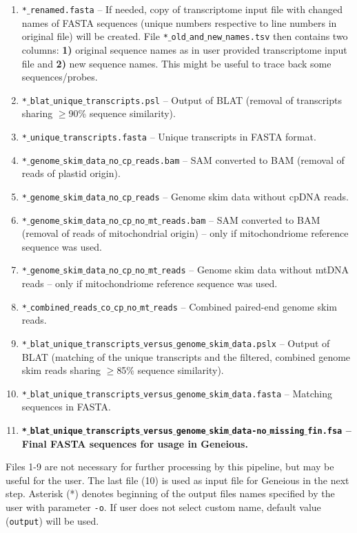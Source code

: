 \documentclass[a4paper, 11pt, twoside]{article}
\begin{document}
\begin{enumerate}[start=0]
  \item \texttt{*$\_$renamed.fasta} -- If needed, copy of transcriptome input file with changed names of FASTA sequences (unique numbers respective to line numbers in original file) will be created. File \texttt{*$\_$old$\_$and$\_$new$\_$names.tsv} then contains two columns: \textbf{1)} original sequence names as in user provided transcriptome input file and \textbf{2)} new sequence names. This might be useful to trace back some sequences/probes.
  \item \texttt{*$\_$blat$\_$unique$\_$transcripts.psl} -- Output of BLAT (removal of transcripts sharing $\geq$90\% sequence similarity).
  \item \texttt{*$\_$unique$\_$transcripts.fasta} -- Unique transcripts in FASTA format.
  \item \texttt{*$\_$genome$\_$skim$\_$data$\_$no$\_$cp$\_$reads.bam} -- SAM converted to BAM (removal of reads of plastid origin).
  \item \texttt{*$\_$genome$\_$skim$\_$data$\_$no$\_$cp$\_$reads} -- Genome skim data without cpDNA reads.
  \item \texttt{*$\_$genome$\_$skim$\_$data$\_$no$\_$cp$\_$no$\_$mt$\_$reads.bam} -- SAM converted to BAM (removal of reads of mitochondrial origin)  -- only if mitochondriome reference sequence was used.
  \item \texttt{*$\_$genome$\_$skim$\_$data$\_$no$\_$cp$\_$no$\_$mt$\_$reads} -- Genome skim data without mtDNA reads -- only if mitochondriome reference sequence was used.
  \item \texttt{*$\_$combined$\_$reads$\_$co$\_$cp$\_$no$\_$mt$\_$reads} -- Combined paired-end genome skim reads.
  \item \texttt{*$\_$blat$\_$unique$\_$transcripts$\_$versus$\_$genome$\_$skim$\_$data.pslx} -- Output of BLAT (ma\-tching of the unique transcripts and the filtered, combined genome skim reads sharing $\geq$85\% sequence similarity).
  \item \texttt{*$\_$blat$\_$unique$\_$transcripts$\_$versus$\_$genome$\_$skim$\_$data.fasta} -- Matching sequences in FASTA.
  \item \textbf{\texttt{*$\_$blat$\_$unique$\_$transcripts$\_$versus$\_$genome$\_$skim$\_$data-no$\_$missing$\_$fin.fsa} -- Final FASTA sequences for usage in Geneious.}
\end{enumerate}

Files 1-9 are not necessary for further processing by this pipeline, but may be useful for the user. The last file (10) is used as input file for Geneious in the next step. Asterisk (*) denotes beginning of the output files names specified by the user with parameter \texttt{-o}. If user does not select custom name, default value (\texttt{output}) will be used.
\end{document}
